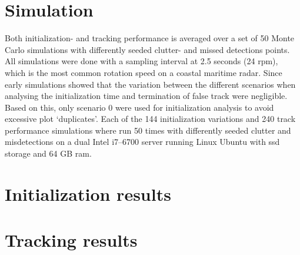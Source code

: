 \section{Simulation}
Both initialization- and tracking performance is averaged over a set of 50 Monte Carlo simulations with differently seeded clutter- and missed detections points. All simulations were done with a sampling interval at 2.5 seconds (24 \gls{rpm}), which is the most common rotation speed on a coastal maritime radar. Since early simulations showed that the variation between the different scenarios when analysing the initialization time and termination of false track were negligible. Based on this, only scenario 0 were used for initialization analysis to avoid excessive plot `duplicates'. Each of the 144 initialization variations and 240 track performance simulations where run 50 times with differently seeded clutter and misdetections on a dual Intel i7--6700 server running Linux Ubuntu with \gls{ssd} storage and 64 GB \gls{ram}.

\section{Initialization results}




\section{Tracking results}

